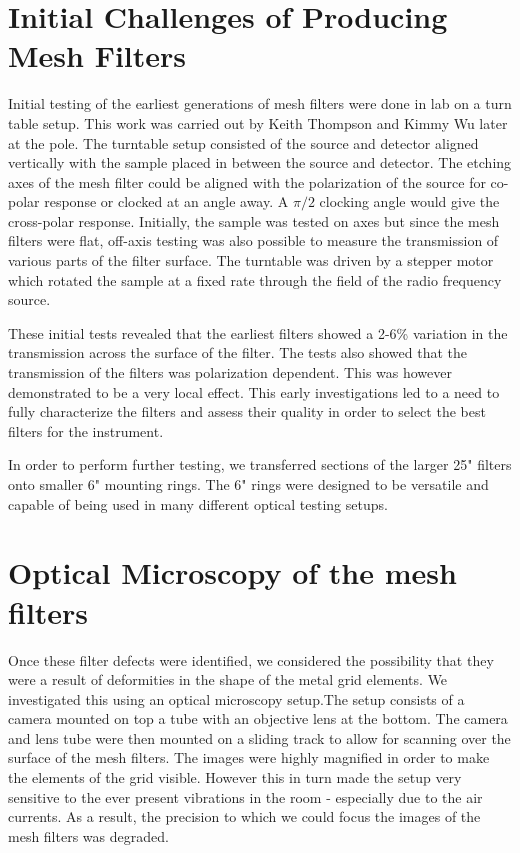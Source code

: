 \documentclass[12pt]{article}
\begin{document}
\section{Initial Challenges of Producing Mesh Filters}
Initial testing of the earliest generations of mesh filters were done in lab on a turn table setup. This work was carried out by Keith Thompson and Kimmy Wu later at the pole. The turntable setup consisted of the source and detector aligned vertically with the sample placed in between the source and detector. The etching axes of the mesh filter could be aligned with the polarization of the source for co-polar response or clocked at an angle away. A $\pi/2$ clocking angle would give the cross-polar response. Initially, the sample was tested on axes but since the mesh filters were flat, off-axis testing was also possible to measure the transmission of various parts of the filter surface. The turntable was driven by a stepper motor which rotated the sample at a fixed rate through the field of the radio frequency source.

These initial tests revealed that the earliest filters showed a 2-6\% variation in the transmission across the surface of the filter. The tests also showed that the transmission of the filters was polarization dependent. This was however demonstrated to be a very local effect. This early investigations led to a need to fully characterize the filters and assess their quality in order to select the best filters for the instrument. 

In order to perform further testing, we transferred sections of the larger 25" filters onto smaller 6" mounting rings. The 6" rings were designed to be versatile and capable of being used in many different optical testing setups. 


\section{Optical Microscopy of the mesh filters}

Once these filter defects were identified, we considered the possibility that they were a result of deformities in the shape of the metal grid elements. We investigated this using an optical microscopy setup.The setup consists of a camera mounted on top a tube with an objective lens at the bottom. The camera and lens tube were then mounted on a sliding track to allow for scanning over the surface of the mesh filters. The images were highly magnified in order to make the elements of the grid visible. However this in turn made the setup very sensitive to the ever present vibrations in the room - especially due to the air currents. As a result, the precision to which we could focus the images of the mesh filters was degraded.
\end{document}
